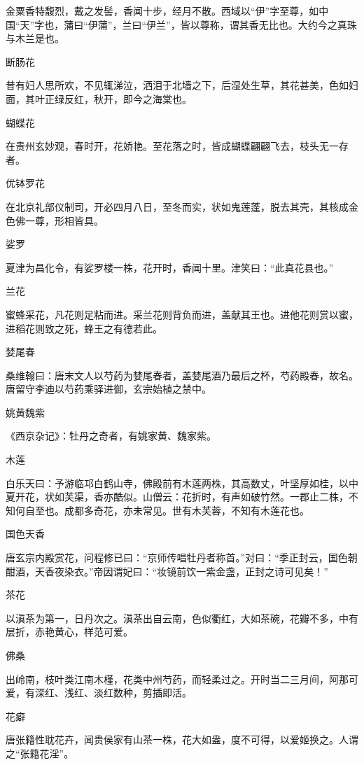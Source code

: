 \documentclass[a4paper,12pt,UTF8,twoside]{ctexbook}
\begin{document}
    金粟香特馥烈，戴之发髻，香闻十步，经月不散。西域以“伊”字至尊，如中国“天”字也，蒲曰“伊蒲”，兰曰“伊兰”，皆以尊称，谓其香无比也。大约今之真珠与木兰是也。
    
    断肠花
    
    昔有妇人思所欢，不见辄涕泣，洒泪于北墙之下，后湿处生草，其花甚美，色如妇面，其叶正绿反红，秋开，即今之海棠也。
    
    蝴蝶花
    
    在贵州玄妙观，春时开，花娇艳。至花落之时，皆成蝴蝶翩翩飞去，枝头无一存者。
    
    优钵罗花
    
    在北京礼部仪制司，开必四月八日，至冬而实，状如鬼莲蓬，脱去其壳，其核成金色佛一尊，形相皆具。
    
    娑罗
    
    夏津为昌化令，有娑罗楼一株，花开时，香闻十里。津笑曰：“此真花县也。”
    
    兰花
    
    蜜蜂采花，凡花则足粘而进。采兰花则背负而进，盖献其王也。进他花则赏以蜜，进稻花则致之死，蜂王之有德若此。
    
    婪尾春
    
    桑维翰曰：唐末文人以芍药为婪尾春者，盖婪尾酒乃最后之杯，芍药殿春，故名。唐留守李迪以芍药乘驿进御，玄宗始植之禁中。
    
    姚黄魏紫
    
    《西京杂记》：牡丹之奇者，有姚家黄、魏家紫。
    
    木莲
    
    白乐天曰：予游临邛白鹤山寺，佛殿前有木莲两株，其高数丈，叶坚厚如桂，以中夏开花，状如芙渠，香亦酷似。山僧云：花折时，有声如破竹然。一郡止二株，不知何自至也。成都多奇花，亦未常见。世有木芙蓉，不知有木莲花也。
    
    国色天香
    
    唐玄宗内殿赏花，问程修已曰：“京师传唱牡丹者称首。”对曰：“季正封云，国色朝酣酒，天香夜染衣。”帝因谓妃曰：“妆镜前饮一紫金盏，正封之诗可见矣！”
    
    茶花
    
    以滇茶为第一，日丹次之。滇茶出自云南，色似衢红，大如茶碗，花瓣不多，中有层折，赤艳黄心，样范可爱。
    
    佛桑
    
    出岭南，枝叶类江南木槿，花类中州芍药，而轻柔过之。开时当二三月间，阿那可爱，有深红、浅红、淡红数种，剪插即活。
    
    花癖
    
    唐张籍性耽花卉，闻贵侯家有山茶一株，花大如盎，度不可得，以爱姬换之。人谓之“张籍花淫”。
    
\end{document}
